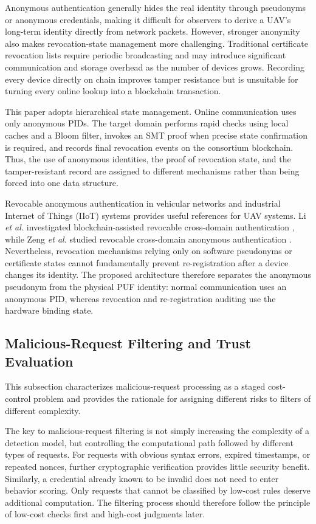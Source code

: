 \documentclass[lettersize,journal]{IEEEtran}
\begin{document}
	
	Anonymous authentication generally hides the real identity through pseudonyms or anonymous credentials, making it difficult for observers to derive a UAV's long-term identity directly from network packets. However, stronger anonymity also makes revocation-state management more challenging. Traditional certificate revocation lists require periodic broadcasting and may introduce significant communication and storage overhead as the number of devices grows. Recording every device directly on chain improves tamper resistance but is unsuitable for turning every online lookup into a blockchain transaction.
	
	This paper adopts hierarchical state management. Online communication uses only anonymous PIDs. The target domain performs rapid checks using local caches and a Bloom filter, invokes an SMT proof when precise state confirmation is required, and records final revocation events on the consortium blockchain. Thus, the use of anonymous identities, the proof of revocation state, and the tamper-resistant record are assigned to different mechanisms rather than being forced into one data structure.
	
	Revocable anonymous authentication in vehicular networks and industrial Internet of Things (IIoT) systems provides useful references for UAV systems. Li \emph{et al.} investigated blockchain-assisted revocable cross-domain authentication \cite{b3}, while Zeng \emph{et al.} studied revocable cross-domain anonymous authentication \cite{b17}. Nevertheless, revocation mechanisms relying only on software pseudonyms or certificate states cannot fundamentally prevent re-registration after a device changes its identity. The proposed architecture therefore separates the anonymous pseudonym from the physical PUF identity: normal communication uses an anonymous PID, whereas revocation and re-registration auditing use the hardware binding state.
	
	\subsection{Malicious-Request Filtering and Trust Evaluation}
	This subsection characterizes malicious-request processing as a staged cost-control problem and provides the rationale for assigning different risks to filters of different complexity.
	
	
	The key to malicious-request filtering is not simply increasing the complexity of a detection model, but controlling the computational path followed by different types of requests. For requests with obvious syntax errors, expired timestamps, or repeated nonces, further cryptographic verification provides little security benefit. Similarly, a credential already known to be invalid does not need to enter behavior scoring. Only requests that cannot be classified by low-cost rules deserve additional computation. The filtering process should therefore follow the principle of low-cost checks first and high-cost judgments later.
	
\end{document}
